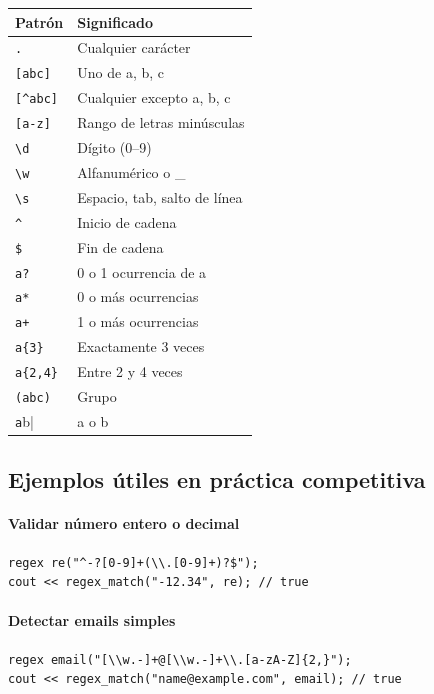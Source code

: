 \documentclass{article}
\begin{document}
\begin{center}
\begin{tabular}{ll}
\hline
Patrón & Significado \\
\hline
\lstinline|.| & Cualquier carácter \\
\lstinline|[abc]| & Uno de a, b, c \\
\lstinline|[^abc]| & Cualquier excepto a, b, c \\
\lstinline|[a-z]| & Rango de letras minúsculas \\
\lstinline|\d| & Dígito (0–9) \\
\lstinline|\w| & Alfanumérico o \_ \\
\lstinline|\s| & Espacio, tab, salto de línea \\
\lstinline|^| & Inicio de cadena \\
\lstinline|$| & Fin de cadena \\
\lstinline|a?| & 0 o 1 ocurrencia de a \\
\lstinline|a*| & 0 o más ocurrencias \\
\lstinline|a+| & 1 o más ocurrencias \\
\lstinline|a{3}| & Exactamente 3 veces \\
\lstinline|a{2,4}| & Entre 2 y 4 veces \\
\lstinline|(abc)| & Grupo \\
\lstinline|a|b| & a o b \\
\hline
\end{tabular}
\end{center}

\subsection{Ejemplos útiles en práctica competitiva}

\paragraph{Validar número entero o decimal}
\begin{lstlisting}[style=cppstyle]
regex re("^-?[0-9]+(\\.[0-9]+)?$");
cout << regex_match("-12.34", re); // true
\end{lstlisting}

\paragraph{Detectar emails simples}
\begin{lstlisting}[style=cppstyle]
regex email("[\\w.-]+@[\\w.-]+\\.[a-zA-Z]{2,}");
cout << regex_match("name@example.com", email); // true
\end{lstlisting}
\end{document}
